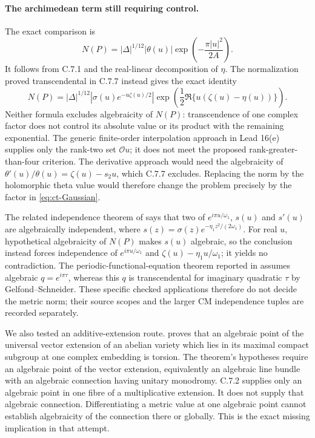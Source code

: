\paragraph{The archimedean term still requiring control.}
The exact comparison is
\begin{equation}\label{eq:ct-Gaussian}
 N(P)=|\Delta|^{1/12}|\theta(u)|
                         \exp\left(-\frac{\pi|u|^2}{2A}\right).
\end{equation}
It follows from C.7.1 and the real-linear decomposition of
$\eta$. The normalization proved transcendental in C.7.7 instead
gives the exact identity
\[
 N(P)=|\Delta|^{1/12}
 \left|\sigma(u)e^{-u\zeta(u)/2}\right|
 \exp\left(\frac12\Re\{u(\zeta(u)-\eta(u))\}\right).
\]
Neither formula excludes algebraicity of $N(P)$: transcendence
of one complex factor does not control its absolute value or
its product with the remaining exponential.
The generic finite-order interpolation approach in Lead 16(e)
supplies only the rank-two set $\mathcal O u$; it does not
meet the proposed rank-greater-than-four criterion. The
derivative approach would need the algebraicity of
$\theta'(u)/\theta(u)=\zeta(u)-s_2u$, which C.7.7 excludes.
Replacing the norm by the holomorphic theta value would
therefore change the problem precisely by the factor in
\eqref{eq:ct-Gaussian}.

The related independence theorem of
\citet[Corollary~2]{reyssat1982weierstrass} says that two of
$e^{i\pi u/\omega_1}$, $s(u)$ and $s'(u)$ are algebraically
independent, where $s(z)=\sigma(z)e^{-\eta_1z^2/(2\omega_1)}$.
For real $u$, hypothetical algebraicity of $N(P)$ makes
$s(u)$ algebraic, so the conclusion instead forces independence
of $e^{i\pi u/\omega_1}$ and
$\zeta(u)-\eta_1u/\omega_1$; it yields no contradiction.
The periodic-functional-equation theorem reported in
\citet[p.~15-05]{waldschmidt1988theta} assumes algebraic
$q=e^{i\pi\tau}$, whereas this $q$ is transcendental for
imaginary quadratic $\tau$ by Gelfond--Schneider.  These
specific checked applications therefore do not decide the
metric norm; their source scopes and the larger CM
independence tuples are recorded separately.

We also tested an additive-extension route.
\citet[Theorem 3.1.2]{bost2009} proves that an algebraic point
of the universal vector extension of an abelian variety which
lies in its maximal compact subgroup at one complex embedding
is torsion. The theorem's hypotheses require an algebraic
point of the vector extension, equivalently an algebraic line
bundle with an algebraic connection having unitary monodromy.
C.7.2 supplies only an algebraic point in one fibre of a
multiplicative extension. It does not supply that algebraic
connection. Differentiating a metric value at one algebraic
point cannot establish algebraicity of the connection there
or globally. This is the exact missing implication in that
attempt.

